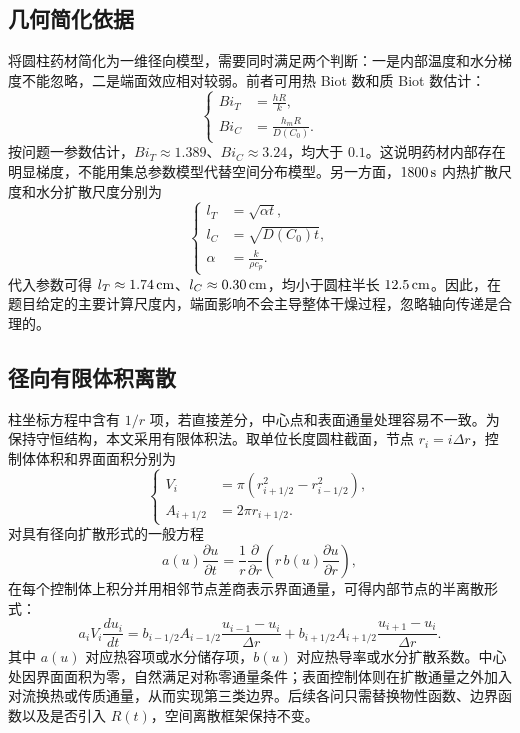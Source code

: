 \documentclass[UTF8,a4paper,12pt]{ctexart}
\begin{document}
\subsection{几何简化依据}
将圆柱药材简化为一维径向模型，需要同时满足两个判断：一是内部温度和水分梯度不能忽略，二是端面效应相对较弱。前者可用热 Biot 数和质 Biot 数估计：
\begin{equation}
\left\{
\begin{aligned}
Bi_T&=\frac{hR}{k},\\
Bi_C&=\frac{h_mR}{D(C_0)}.
\end{aligned}
\right.
\end{equation}
按问题一参数估计，$Bi_T\approx1.389$、$Bi_C\approx3.24$，均大于 $0.1$。这说明药材内部存在明显梯度，不能用集总参数模型代替空间分布模型。另一方面，$1800\rm\,s$ 内热扩散尺度和水分扩散尺度分别为
\begin{equation}
\left\{
\begin{aligned}
l_T&=\sqrt{\alpha t},\\
l_C&=\sqrt{D(C_0)t},\\
\alpha&=\frac{k}{\rho c_p}.
\end{aligned}
\right.
\end{equation}
代入参数可得 $l_T\approx1.74\rm\,cm$、$l_C\approx0.30\rm\,cm$，均小于圆柱半长 $12.5\rm\,cm$。因此，在题目给定的主要计算尺度内，端面影响不会主导整体干燥过程，忽略轴向传递是合理的。

\subsection{径向有限体积离散}
柱坐标方程中含有 $1/r$ 项，若直接差分，中心点和表面通量处理容易不一致。为保持守恒结构，本文采用有限体积法。取单位长度圆柱截面，节点 $r_i=i\Delta r$，控制体体积和界面面积分别为
\begin{equation}
\left\{
\begin{aligned}
V_i&=\pi\left(r_{i+1/2}^2-r_{i-1/2}^2\right),\\
A_{i+1/2}&=2\pi r_{i+1/2}.
\end{aligned}
\right.
\end{equation}
对具有径向扩散形式的一般方程
\begin{equation}
  a(u)\frac{\partial u}{\partial t}
  =\frac1r\frac{\partial}{\partial r}\left(r\,b(u)\frac{\partial u}{\partial r}\right),
\end{equation}
在每个控制体上积分并用相邻节点差商表示界面通量，可得内部节点的半离散形式：
\begin{equation}
  a_iV_i\frac{du_i}{dt}
  =b_{i-1/2}A_{i-1/2}\frac{u_{i-1}-u_i}{\Delta r}
  +b_{i+1/2}A_{i+1/2}\frac{u_{i+1}-u_i}{\Delta r}.
\end{equation}
其中 $a(u)$ 对应热容项或水分储存项，$b(u)$ 对应热导率或水分扩散系数。中心处因界面面积为零，自然满足对称零通量条件；表面控制体则在扩散通量之外加入对流换热或传质通量，从而实现第三类边界。后续各问只需替换物性函数、边界函数以及是否引入 $R(t)$，空间离散框架保持不变。
\end{document}
